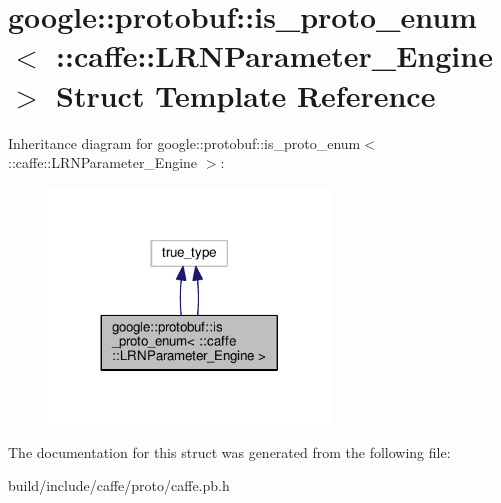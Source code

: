 \hypertarget{structgoogle_1_1protobuf_1_1is__proto__enum_3_01_1_1caffe_1_1_l_r_n_parameter___engine_01_4}{}\section{google\+:\+:protobuf\+:\+:is\+\_\+proto\+\_\+enum$<$ \+:\+:caffe\+:\+:L\+R\+N\+Parameter\+\_\+\+Engine $>$ Struct Template Reference}
\label{structgoogle_1_1protobuf_1_1is__proto__enum_3_01_1_1caffe_1_1_l_r_n_parameter___engine_01_4}


Inheritance diagram for google\+:\+:protobuf\+:\+:is\+\_\+proto\+\_\+enum$<$ \+:\+:caffe\+:\+:L\+R\+N\+Parameter\+\_\+\+Engine $>$\+:
\nopagebreak
\begin{figure}[H]
\begin{center}
\leavevmode
\includegraphics[width=212pt]{structgoogle_1_1protobuf_1_1is__proto__enum_3_01_1_1caffe_1_1_l_r_n_parameter___engine_01_4__inherit__graph}
\end{center}
\end{figure}


The documentation for this struct was generated from the following file\+:\begin{DoxyCompactItemize}
\item 
build/include/caffe/proto/caffe.\+pb.\+h\end{DoxyCompactItemize}
